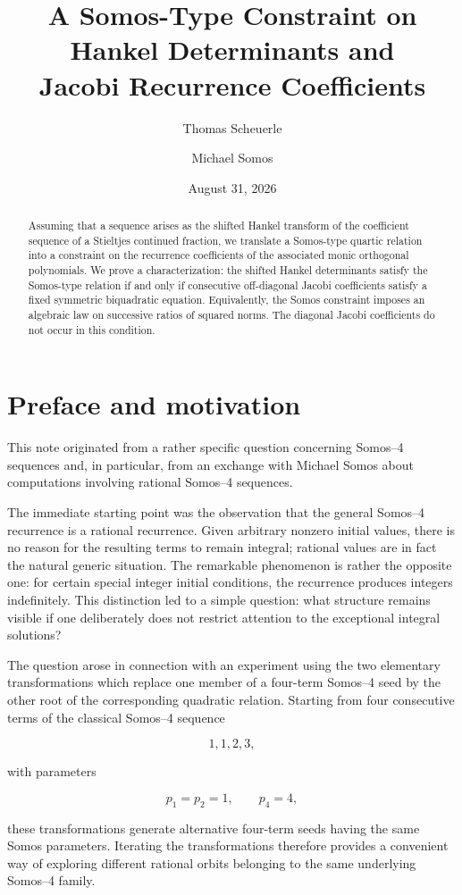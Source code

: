 \documentclass[11pt]{article}
\title{A Somos-Type Constraint on Hankel Determinants and\\Jacobi Recurrence Coefficients}
\author{Thomas Scheuerle \and Michael Somos}
\date{August 31, 2026}
\theoremstyle{remark}
\begin{document}
\maketitle

\begin{abstract}
Assuming that a sequence arises as the shifted Hankel transform of the coefficient sequence of a Stieltjes continued fraction, we translate a Somos-type quartic relation into a constraint on the recurrence coefficients of the associated monic orthogonal polynomials. We prove a characterization: the shifted Hankel determinants satisfy the Somos-type relation if and only if consecutive off-diagonal Jacobi coefficients satisfy a fixed symmetric biquadratic equation. Equivalently, the Somos constraint imposes an algebraic law on successive ratios of squared norms. The diagonal Jacobi coefficients do not occur in this condition.
\end{abstract}

\section*{Preface and motivation}

This note originated from a rather specific question concerning Somos--4 sequences and, in particular, from an exchange with Michael Somos about computations involving rational Somos--4 sequences.

The immediate starting point was the observation that the general Somos--4 recurrence is a rational recurrence. Given arbitrary nonzero initial values, there is no reason for the resulting terms to remain integral; rational values are in fact the natural generic situation. The remarkable phenomenon is rather the opposite one: for certain special integer initial conditions, the recurrence produces integers indefinitely. This distinction led to a simple question: what structure remains visible if one deliberately does not restrict attention to the exceptional integral solutions?

The question arose in connection with an experiment using the two elementary transformations which replace one member of a four-term Somos--4 seed by the other root of the corresponding quadratic relation. Starting from four consecutive terms of the classical Somos--4 sequence

$$
1,1,2,3,
$$

with parameters

$$
p_1=p_2=1,\qquad p_4=4,
$$

these transformations generate alternative four-term seeds having the same Somos parameters. Iterating the transformations therefore provides a convenient way of exploring different rational orbits belonging to the same underlying Somos--4 family.
\end{document}
